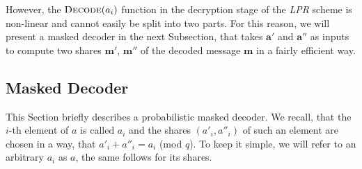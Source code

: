 However, the \(\textsc{Decode}(a_{i})\) function in the decryption stage of the \textit{\ac{LPR}} scheme is non-linear and cannot easily be split into two parts. For this reason, we will present a masked decoder in the next Subsection, that takes \(\textbf{a}'\) and \(\textbf{a}''\) as inputs to compute two shares \(\textbf{m}'\), \(\textbf{m}''\) of the decoded message \(\textbf{m}\) in a fairly efficient way.

\subsection{Masked Decoder}
This Section briefly describes a probabilistic masked decoder. We recall, that the \(i\)-th element of \(\textit{a}\) is called \(a_i\) and the shares \((a'_i,a''_i)\) of such an element are chosen in a way, that \(a'_i + a''_i = a_i\) (mod \(q\)). To keep it simple, we will refer to an arbitrary \(a_i\) as \(a\), the same follows for its shares.

